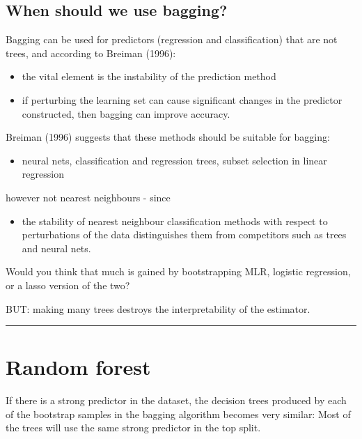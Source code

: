 \documentclass[
  letterpaper,
  DIV=11,
  numbers=noendperiod]{scrartcl}
\providecommand{\tightlist}{%
  \setlength{\itemsep}{0pt}\setlength{\parskip}{0pt}}\usepackage{longtable,booktabs,array}
\begin{document}
\hypertarget{when-should-we-use-bagging}{%
\subsection{When should we use
bagging?}\label{when-should-we-use-bagging}}

Bagging can be used for predictors (regression and classification) that
are not trees, and according to Breiman (1996):

\begin{itemize}
\tightlist
\item
  the vital element is the instability of the prediction method
\item
  if perturbing the learning set can cause significant changes in the
  predictor constructed, then bagging can improve accuracy.
\end{itemize}

Breiman (1996) suggests that these methods should be suitable for
bagging:

\begin{itemize}
\tightlist
\item
  neural nets, classification and regression trees, subset selection in
  linear regression
\end{itemize}

however not nearest neighbours - since

\begin{itemize}
\tightlist
\item
  the stability of nearest neighbour classification methods with respect
  to perturbations of the data distinguishes them from competitors such
  as trees and neural nets.
\end{itemize}

Would you think that much is gained by bootstrapping MLR, logistic
regression, or a lasso version of the two?

BUT: making many trees destroys the interpretability of the estimator.

\begin{center}\rule{0.5\linewidth}{0.5pt}\end{center}

\hypertarget{random-forest}{%
\section{Random forest}\label{random-forest}}

If there is a strong predictor in the dataset, the decision trees
produced by each of the bootstrap samples in the bagging algorithm
becomes very similar: Most of the trees will use the same strong
predictor in the top split.
\end{document}
